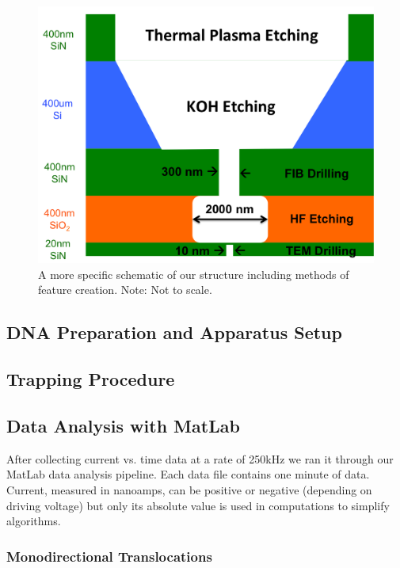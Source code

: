 \documentclass[aps,prl,preprint,groupedaddress]{revtex4}
\begin{document}
\begin{figure}[h]
\centering
\includegraphics[width=.45\textwidth]{figures/structure-schematic}
\caption{A more specific schematic of our structure including methods of feature creation. Note: Not to scale.}
\label{fig:structure-schematic}
\end{figure}

\subsection{DNA Preparation and Apparatus Setup}



\subsection{Trapping Procedure}



\subsection{Data Analysis with MatLab}

After collecting current vs. time data at a rate of 250kHz we ran it through our MatLab data analysis pipeline.
Each data file contains one minute of data.
Current, measured in nanoamps, can be positive or negative (depending on driving voltage) but only its absolute value is used in computations to simplify algorithms.

\subsubsection{Monodirectional Translocations}
\end{document}
